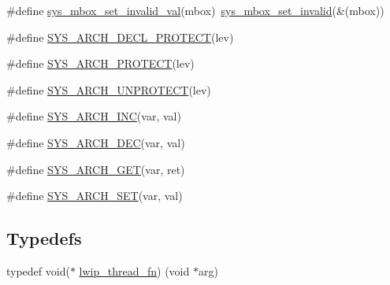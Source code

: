 \begin{DoxyCompactItemize}
\item 
\#define \hyperlink{openmote-cc2538_2lwip_2src_2include_2lwip_2sys_8h_ae293feebb61d36f2db99be53702b8203}{sys\+\_\+mbox\+\_\+set\+\_\+invalid\+\_\+val}(mbox)~\hyperlink{group__sys__mbox_ga53ddec9d7f5500c5b1d982cd17493172}{sys\+\_\+mbox\+\_\+set\+\_\+invalid}(\&(mbox))
\item 
\#define \hyperlink{openmote-cc2538_2lwip_2src_2include_2lwip_2sys_8h_a945395fa326214fc9736487242710a90}{S\+Y\+S\+\_\+\+A\+R\+C\+H\+\_\+\+D\+E\+C\+L\+\_\+\+P\+R\+O\+T\+E\+CT}(lev)
\item 
\#define \hyperlink{openmote-cc2538_2lwip_2src_2include_2lwip_2sys_8h_a3d0e48feafd378e9c26c64567ecd8bab}{S\+Y\+S\+\_\+\+A\+R\+C\+H\+\_\+\+P\+R\+O\+T\+E\+CT}(lev)
\item 
\#define \hyperlink{openmote-cc2538_2lwip_2src_2include_2lwip_2sys_8h_a2f48e97047945642ddeb27e65bf4ffe2}{S\+Y\+S\+\_\+\+A\+R\+C\+H\+\_\+\+U\+N\+P\+R\+O\+T\+E\+CT}(lev)
\item 
\#define \hyperlink{openmote-cc2538_2lwip_2src_2include_2lwip_2sys_8h_acc5f7f8cbd020de628d1e9a0443da4c7}{S\+Y\+S\+\_\+\+A\+R\+C\+H\+\_\+\+I\+NC}(var,  val)
\item 
\#define \hyperlink{openmote-cc2538_2lwip_2src_2include_2lwip_2sys_8h_aa9a585faa63acdd5d59ac5e7759a07c5}{S\+Y\+S\+\_\+\+A\+R\+C\+H\+\_\+\+D\+EC}(var,  val)
\item 
\#define \hyperlink{openmote-cc2538_2lwip_2src_2include_2lwip_2sys_8h_a0da95147531964d619be7744c7169986}{S\+Y\+S\+\_\+\+A\+R\+C\+H\+\_\+\+G\+ET}(var,  ret)
\item 
\#define \hyperlink{openmote-cc2538_2lwip_2src_2include_2lwip_2sys_8h_a24ff55288a4d9fa28100c78b2f4612f6}{S\+Y\+S\+\_\+\+A\+R\+C\+H\+\_\+\+S\+ET}(var,  val)
\end{DoxyCompactItemize}
\subsection*{Typedefs}
\begin{DoxyCompactItemize}
\item 
typedef void($\ast$ \hyperlink{openmote-cc2538_2lwip_2src_2include_2lwip_2sys_8h_ae30a77bf6bd69bfcc5f235eaad54f2b9}{lwip\+\_\+thread\+\_\+fn}) (void $\ast$arg)
\end{DoxyCompactItemize}
